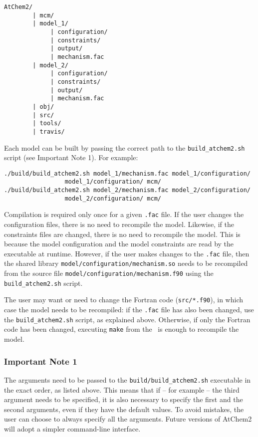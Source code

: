 \newpage
\begin{verbatim}
AtChem2/
        | mcm/
        | model_1/
             | configuration/
             | constraints/
             | output/
             | mechanism.fac
        | model_2/
             | configuration/
             | constraints/
             | output/
             | mechanism.fac
        | obj/
        | src/
        | tools/
        | travis/
\end{verbatim}

Each model can be built by passing the correct path to the
\texttt{build\_atchem2.sh} script (see Important Note 1). For example:

\begin{verbatim}
./build/build_atchem2.sh model_1/mechanism.fac model_1/configuration/
                 model_1/configuration/ mcm/
./build/build_atchem2.sh model_2/mechanism.fac model_2/configuration/
                 model_2/configuration/ mcm/
\end{verbatim}

Compilation is required only once for a given \texttt{.fac} file. If
the user changes the configuration files, there is no need to
recompile the model. Likewise, if the constraints files are changed,
there is no need to recompile the model. This is because the model
configuration and the model constraints are read by the executable at
runtime. However, if the user makes changes to the \texttt{.fac} file,
then the shared library \texttt{model/configuration/mechanism.so}
needs to be recompiled from the source file
\texttt{model/configuration/mechanism.f90} using the \texttt{build\_atchem2.sh}
script.

The user may want or need to change the Fortran code
(\texttt{src/*.f90}), in which case the model needs to be recompiled:
if the \texttt{.fac} file has also been changed, use the
\texttt{build\_atchem2.sh} script, as explained above. Otherwise, if only the
Fortran code has been changed, executing \texttt{make} from the
\maindir\ is enough to recompile the model.

\subsubsection{Important Note 1}

The arguments need to be passed to the \texttt{build/build\_atchem2.sh}
executable in the exact order, as listed above. This means that if --
for example -- the third argument needs to be specified, it is also
necessary to specify the first and the second arguments, even if they
have the default values. To avoid mistakes, the user can choose to
always specify all the arguments. Future versions of AtChem2 will
adopt a simpler command-line interface.

